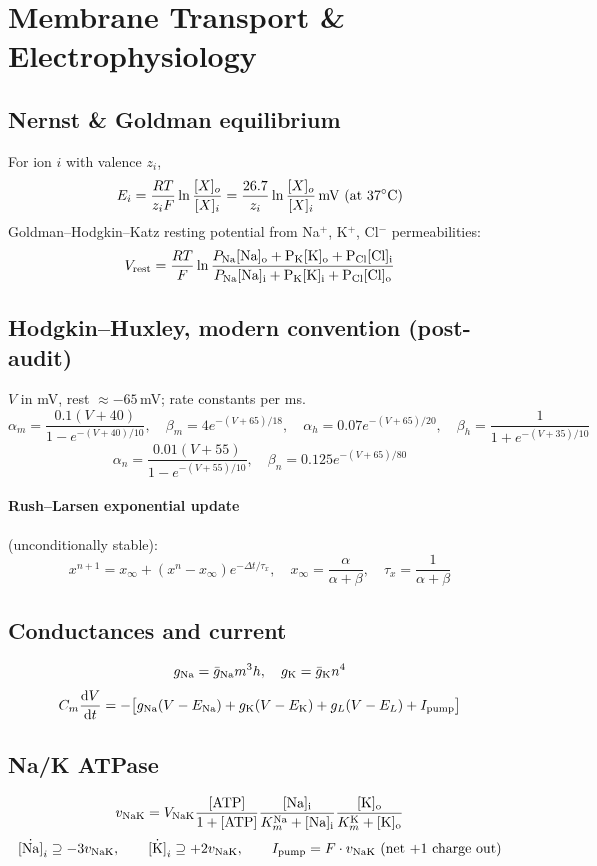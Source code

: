 \documentclass[11pt,a4paper]{article}
\newcommand{\eq}[1]{\begin{equation}#1\end{equation}}
\begin{document}
\clearpage
\section{Membrane Transport \& Electrophysiology}
\label{sec:membrane}

\subsection{Nernst \& Goldman equilibrium}
For ion $i$ with valence $z_i$,
\eq{ E_i = \frac{RT}{z_i F}\ln\frac{[X]_o}{[X]_i} = \frac{26.7}{z_i}\ln\frac{[X]_o}{[X]_i}\,\si{mV}\ (\text{at 37\si{\celsius}}) }
Goldman--Hodgkin--Katz resting potential from Na$^+$, K$^+$, Cl$^-$ permeabilities:
\eq{ V_{\rm rest} = \frac{RT}{F}\ln\frac{P_{\rm Na}[\rm Na]_o + P_{\rm K}[\rm K]_o + P_{\rm Cl}[\rm Cl]_i}{P_{\rm Na}[\rm Na]_i + P_{\rm K}[\rm K]_i + P_{\rm Cl}[\rm Cl]_o} }

\subsection{Hodgkin--Huxley, modern convention (post-audit)}
$V$ in \si{mV}, rest $\approx -65$\,mV; rate constants per ms.
\eq{ \alpha_m=\frac{0.1(V+40)}{1-e^{-(V+40)/10}},\quad \beta_m=4 e^{-(V+65)/18},\quad \alpha_h=0.07 e^{-(V+65)/20},\quad \beta_h=\frac{1}{1+e^{-(V+35)/10}} }
\eq{ \alpha_n=\frac{0.01(V+55)}{1-e^{-(V+55)/10}},\quad \beta_n=0.125 e^{-(V+65)/80} }
\paragraph{Rush--Larsen exponential update} (unconditionally stable):
\eq{ x^{n+1}=x_\infty+(x^n-x_\infty)e^{-\Delta t/\tau_x},\quad x_\infty=\frac{\alpha}{\alpha+\beta},\quad \tau_x=\frac{1}{\alpha+\beta} }

\subsection{Conductances and current}
\eq{ g_{\rm Na}=\bar g_{\rm Na}m^3h,\quad g_{\rm K}=\bar g_{\rm K} n^4 }
\eq{ C_m\frac{\mathrm dV}{\mathrm dt} = -\big[g_{\rm Na}(V-E_{\rm Na}) + g_{\rm K}(V-E_{\rm K}) + g_L(V-E_L) + I_{\rm pump}\big] }

\subsection{Na/K ATPase}
\eq{ v_{\rm NaK}=V_{\rm NaK}\frac{[\rm ATP]}{1+[\rm ATP]}\frac{[\rm Na]_i}{K_m^{\rm Na}+[\rm Na]_i}\frac{[\rm K]_o}{K_m^{\rm K}+[\rm K]_o} }
\eq{ \dot{[\rm Na]}_i\supseteq -3v_{\rm NaK},\qquad \dot{[\rm K]}_i\supseteq+2 v_{\rm NaK},\qquad I_{\rm pump}=F\cdot v_{\rm NaK}\text{ (net +1 charge out)} }
\end{document}

